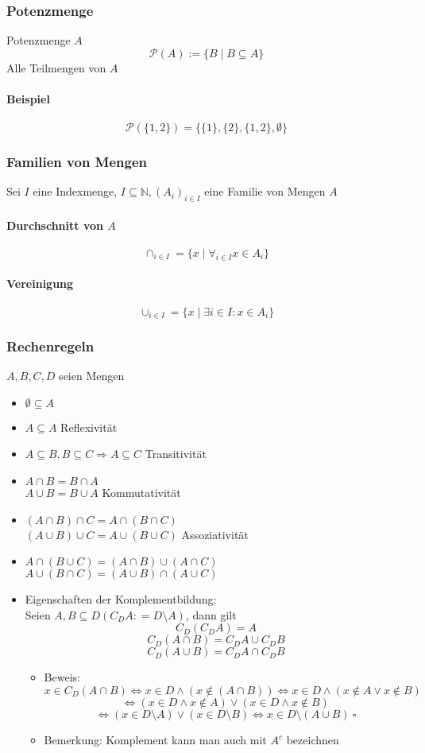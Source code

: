 \documentclass[a4paper]{scrartcl}
\DeclareMathOperator{\Forall}{\forall}%
\begin{document}
\subsubsection{Potenzmenge}
\label{sec-2-2-3}
Potenzmenge $A$
\[\mathcal{P}(A) := \{B\mid B\subseteq A\}\]
Alle Teilmengen von $A$
\paragraph{Beispiel}
\label{sec-2-2-3-1}
\[\mathcal{P}(\{1,2\}) = \{\{1\}, \{2\}, \{1,2\}, \emptyset\}\]
\subsubsection{Familien von Mengen}
\label{sec-2-2-4}
Sei $I$ eine Indexmenge, $I \subseteq \mathbb{N}, (A_i)_{i\in I}$ eine Familie von Mengen $A$
\paragraph{Durchschnitt von $A$}
\label{sec-2-2-4-1}
\[\cap_{i\in I} = \{x\mid \Forall_{i\in I} x\in A_i\}\]
\paragraph{Vereinigung}
\label{sec-2-2-4-2}
\[\cup_{i\in I} = \{x\mid\exists i\in I: x\in A_i\}\]
\subsubsection{Rechenregeln}
\label{sec-2-2-5}
$A,B,C,D$ seien Mengen
\begin{itemize}
\item $\emptyset \subseteq A$
\item $A\subseteq A$ \hfill Reflexivität
\item $A\subseteq B, B\subseteq C \Rightarrow A\subseteq C$ \hfill Transitivität
\item $A\cap B = B\cap A$ \\ $A\cup B = B\cup A$ \hfill Kommutativität
\item $(A\cap B)\cap C = A\cap (B\cap C)$ \\ $(A\cup B) \cup C = A\cup (B\cup C)$ \hfill Assoziativität
\item $A\cap (B\cup C) =(A\cap B) \cup (A\cap C)$ \\ $A\cup (B\cap C) =(A\cup B) \cap (A\cup C)$
\item Eigenschaften der Komplementbildung: \\
      Seien $A,B \subseteq D (C_D A: = D\setminus A)$, dann gilt \[C_D (C_D A) = A\] \[C_D(A\cap B) = C_D A \cup C_D B\] \[C_D(A\cup B) = C_D A \cap C_D B\]
\begin{itemize}
\item Beweis:
\[x\in C_D(A\cap B) \Leftrightarrow x\in D \wedge (x\not\in (A\cap B)) \Leftrightarrow x\in D \wedge (x\not\in A \vee x\not\in B)\] \[\Leftrightarrow (x\in D\wedge x\not\in A) \vee (x\in D \wedge x\not\in B)\] \[\Leftrightarrow (x\in D\setminus A) \vee (x\in D\setminus B) \Leftrightarrow x\in D\setminus(A\cup B)~\square\]
\item Bemerkung: Komplement kann man auch mit $A^c$ bezeichnen
\end{itemize}
\end{itemize}
\end{document}
